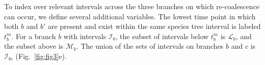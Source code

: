 \documentclass[11pt]{article}
\begin{document}







To index over relevant intervals across the three branches on which re-coalescence
can occur, we define several additional variables. The lowest time point in which both 
$b$ and $b'$ are present and exist within the same species tree interval is labeled 
$t_b^m$. For a branch $b$ with intervals $\mathcal{I}_b$, the subset of intervals 
below $t_b^m$ is $\mathcal{L}_b$, and the subset above is $\mathcal{M}_b$. 
The union of the sets of intervals on branches $b$ and $c$ is $\mathcal{I}_{bc}$
(Fig.~\ref{fig:fig3}e).
\end{document}
